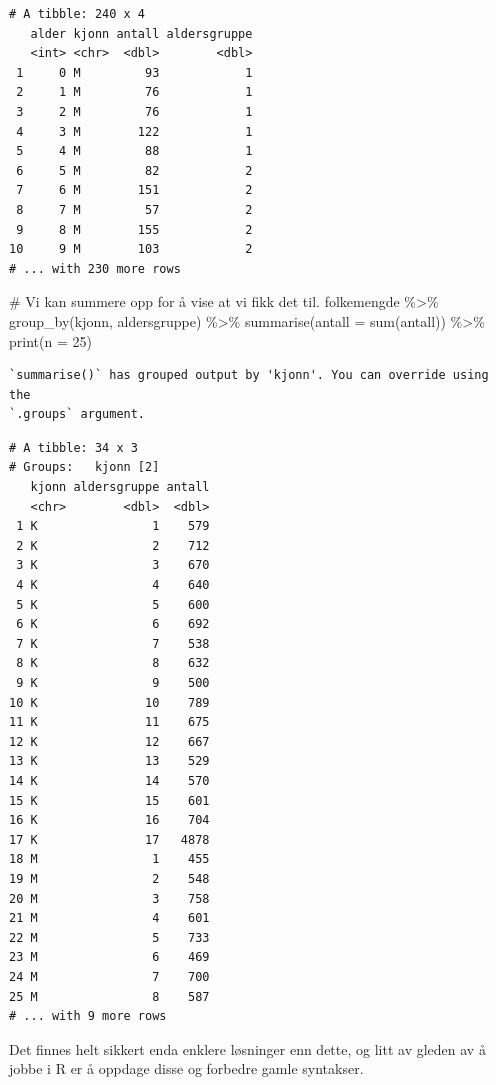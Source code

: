 \documentclass[
  letterpaper,
  DIV=11,
  numbers=noendperiod]{scrreprt}
\newenvironment{Shaded}{\begin{snugshade}}{\end{snugshade}}
\newcommand{\AttributeTok}[1]{\textcolor[rgb]{0.40,0.45,0.13}{#1}}
\newcommand{\CommentTok}[1]{\textcolor[rgb]{0.37,0.37,0.37}{#1}}
\newcommand{\DecValTok}[1]{\textcolor[rgb]{0.68,0.00,0.00}{#1}}
\newcommand{\FunctionTok}[1]{\textcolor[rgb]{0.28,0.35,0.67}{#1}}
\newcommand{\NormalTok}[1]{\textcolor[rgb]{0.00,0.23,0.31}{#1}}
\newcommand{\SpecialCharTok}[1]{\textcolor[rgb]{0.37,0.37,0.37}{#1}}
\begin{document}
\begin{verbatim}
# A tibble: 240 x 4
   alder kjonn antall aldersgruppe
   <int> <chr>  <dbl>        <dbl>
 1     0 M         93            1
 2     1 M         76            1
 3     2 M         76            1
 4     3 M        122            1
 5     4 M         88            1
 6     5 M         82            2
 7     6 M        151            2
 8     7 M         57            2
 9     8 M        155            2
10     9 M        103            2
# ... with 230 more rows
\end{verbatim}

\begin{Shaded}
\begin{Highlighting}[]
\CommentTok{\# Vi kan summere opp  for å vise at vi fikk det til.}
\NormalTok{folkemengde }\SpecialCharTok{\%\textgreater{}\%} 
  \FunctionTok{group\_by}\NormalTok{(kjonn, aldersgruppe) }\SpecialCharTok{\%\textgreater{}\%} 
  \FunctionTok{summarise}\NormalTok{(}\AttributeTok{antall =} \FunctionTok{sum}\NormalTok{(antall)) }\SpecialCharTok{\%\textgreater{}\%} 
  \FunctionTok{print}\NormalTok{(}\AttributeTok{n =} \DecValTok{25}\NormalTok{)}
\end{Highlighting}
\end{Shaded}

\begin{verbatim}
`summarise()` has grouped output by 'kjonn'. You can override using the
`.groups` argument.
\end{verbatim}

\begin{verbatim}
# A tibble: 34 x 3
# Groups:   kjonn [2]
   kjonn aldersgruppe antall
   <chr>        <dbl>  <dbl>
 1 K                1    579
 2 K                2    712
 3 K                3    670
 4 K                4    640
 5 K                5    600
 6 K                6    692
 7 K                7    538
 8 K                8    632
 9 K                9    500
10 K               10    789
11 K               11    675
12 K               12    667
13 K               13    529
14 K               14    570
15 K               15    601
16 K               16    704
17 K               17   4878
18 M                1    455
19 M                2    548
20 M                3    758
21 M                4    601
22 M                5    733
23 M                6    469
24 M                7    700
25 M                8    587
# ... with 9 more rows
\end{verbatim}

Det finnes helt sikkert enda enklere løsninger enn dette, og litt av
gleden av å jobbe i R er å oppdage disse og forbedre gamle syntakser.
\end{document}
